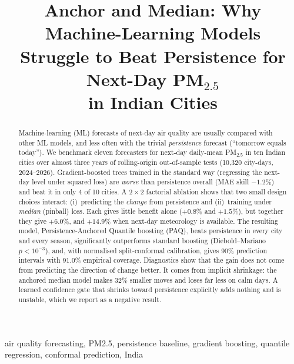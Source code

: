 \documentclass[conference]{IEEEtran}
\begin{document}
\title{Anchor and Median: Why Machine-Learning Models\\Struggle to Beat Persistence for Next-Day PM$_{2.5}$\\in Indian Cities}

\author{
}

\maketitle

\begin{abstract}
Machine-learning (ML) forecasts of next-day air quality are usually compared with
other ML models, and less often with the trivial \emph{persistence} forecast
(``tomorrow equals today''). We benchmark eleven forecasters for next-day
daily-mean PM$_{2.5}$ in ten Indian cities over almost three years of
rolling-origin out-of-sample tests (10{,}320 city-days, 2024--2026). Gradient-boosted trees
trained in the standard way (regressing the next-day level under squared loss) are
\emph{worse} than persistence overall (MAE skill $-1.2\%$) and beat it in only
4 of 10 cities. A $2\times2$ factorial ablation shows that two small design
choices interact: (i)~predicting the \emph{change} from persistence and (ii)~training under
\emph{median} (pinball) loss. Each gives little benefit alone ($+0.8\%$ and
$+1.5\%$), but together they give $+6.0\%$, and $+14.9\%$ when next-day
meteorology is available. The resulting model, Persistence-Anchored Quantile
boosting (PAQ), beats persistence in every city and every season, significantly outperforms
standard boosting (Diebold--Mariano $p<10^{-3}$), and, with normalised
split-conformal calibration, gives 90\% prediction intervals with 91.0\% empirical coverage.
Diagnostics show that the gain does not come from predicting the direction of change better.
It comes from implicit shrinkage: the anchored median model makes 32\% smaller moves and loses far less on
calm days. A learned confidence gate that shrinks toward persistence explicitly
adds nothing and is unstable, which we report as a negative result.
\end{abstract}

\begin{IEEEkeywords}
air quality forecasting, PM2.5, persistence baseline, gradient boosting, quantile regression, conformal prediction, India
\end{IEEEkeywords}
\end{document}
